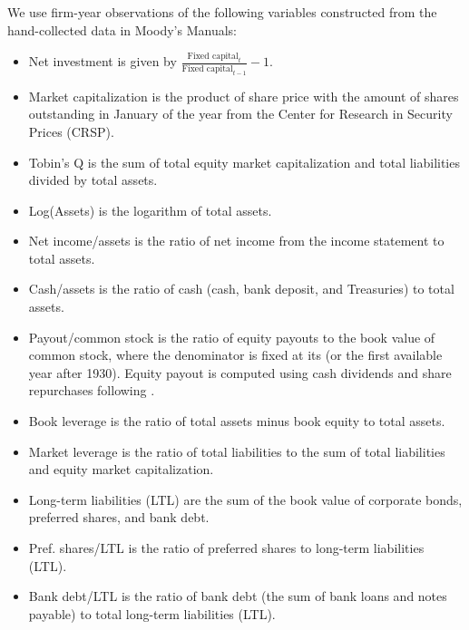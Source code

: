 We use firm-year observations of the following variables constructed from the hand-collected data in Moody's Manuals:
	\begin{itemize}
		\item Net investment is given by $\frac{\text{Fixed capital}_t}{\text{Fixed capital}_{t-1}} - 1$.

        \item Market capitalization is the product of share price with the amount of shares outstanding in January of the year from the Center for Research in Security Prices (CRSP).
        
		\item Tobin's Q is the sum of total equity market capitalization and total liabilities divided by total assets.

        \item Log(Assets) is the logarithm of total assets.

        \item Net income/assets is the ratio of net income from the income statement to total assets. 

        \item Cash/assets is the ratio of cash (cash, bank deposit, and Treasuries) to total assets. 

		\item Payout/common stock is the ratio of equity payouts to the book value of common stock, where the denominator is fixed at its  (or the first available year after 1930). Equity payout is computed using cash dividends and share repurchases following \cite{Boudoukh2007}.
        
		\item Book leverage is the ratio of total assets minus book equity to total assets.

        \item Market leverage is the ratio of total liabilities to the sum of total liabilities and equity market capitalization. 
        
        \item Long-term liabilities (LTL) are the sum of the book value of corporate bonds, preferred shares, and bank debt. 
		
		\item Pref. shares/LTL is the ratio of preferred shares to long-term liabilities (LTL).
		
		\item Bank debt/LTL is the ratio of bank debt (the sum of bank loans and notes payable) to total long-term liabilities (LTL).		
		

\end{itemize}
